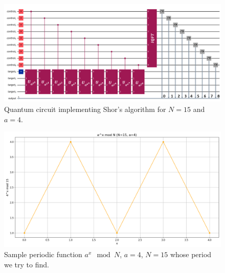 \documentclass[conference,twoside]{IEEEtran}
\begin{document}
\begin{figure}[t]
    \centering  \includegraphics[width=1\columnwidth,keepaspectratio]{New_Fig1.png}
    \caption{Quantum circuit implementing Shor's algorithm for $N=15$ and $a=4$.}
    \label{fig:Schor_circuit}
\end{figure}

\begin{figure}[t]
    \centering  \includegraphics[width=0.9\columnwidth,keepaspectratio]{ax_mod_N15_a4.png}
    \caption{Sample periodic function \(a^x \mod N\), $a=4$, $N=15$ whose period we try to find.}
    \label{fig:fig1}
\end{figure}
\end{document}
